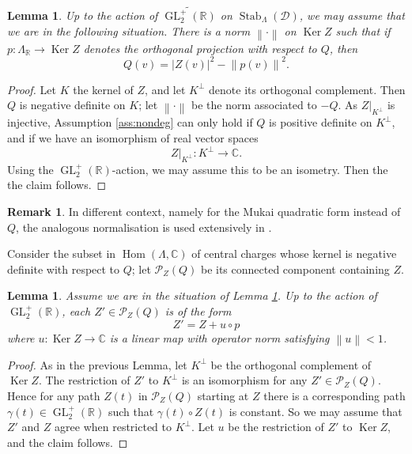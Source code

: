 \documentclass[leqno,11pt,twoside]{amsart}
\newtheorem{Lem}[Thm]{Lemma}
\theoremstyle{definition}
\newtheorem{Rem}[Thm]{Remark}
\begin{document}
\begin{Lem} \label{lem:coords}
Up to the action of ${\widetilde{{\mathop{\mathrm{GL}}\nolimits}_2^+({\ensuremath{\mathbb{R}}})}}$ on ${\mathop{\mathrm{Stab}}\nolimits}_\Lambda({\ensuremath{\mathcal D}})$, we may assume that we are in
the following situation.
There is a norm $\left\|\cdot\right\|$ on ${\mathop{\mathrm{Ker}}\nolimits} Z$ such that if $p \colon \Lambda_{\ensuremath{\mathbb{R}}} \to {\mathop{\mathrm{Ker}}\nolimits} Z$ denotes the orthogonal
projection with respect to $Q$, then
\[ Q(v) = {\left\lvert{Z(v)}\right\rvert}^2 - {\left\|{p(v)}\right\|}^2.\]
\end{Lem}
\begin{proof}
Let $K$ the kernel of $Z$, and let $K^\perp$ denote its orthogonal complement. Then $Q$ is negative
definite on $K$; let ${\left\|{\cdot}\right\|}$ be the norm associated to $-Q$. 
As $Z|_{K^\perp}$ is injective, Assumption \ref{ass:nondeg} can only hold
if $Q$ is positive definite on $K^\perp$, and  if we have an isomorphism of real vector spaces
\[ Z|_{K^\perp} \colon K^\perp \to {\ensuremath{\mathbb{C}}}. \]
Using the ${\mathop{\mathrm{GL}}\nolimits}_2^+({\ensuremath{\mathbb{R}}})$-action, we may assume this to be an
isometry. Then the the claim follows.
\end{proof}

\begin{Rem} In different context, namely for the Mukai quadratic form instead of $Q$, the analogous normalisation is used extensively in \cite{Bridgeland:K3}.
\end{Rem}

Consider the subset in ${\mathop{\mathrm{Hom}}\nolimits}(\Lambda, {\ensuremath{\mathbb{C}}})$ of central charges whose kernel is
negative definite with respect to $Q$; let ${\ensuremath{\mathcal P}}_Z(Q)$ be its connected component containing $Z$.
\begin{Lem} \label{lem:deformincoords}
Assume we are in the situation of Lemma \ref{lem:coords}.
Up to the action of ${\mathop{\mathrm{GL}}\nolimits}_2^+({\ensuremath{\mathbb{R}}})$, each $Z' \in {\ensuremath{\mathcal P}}_Z(Q)$ is of the form 
\[ Z' = Z + u \circ p \]
where $u \colon {\mathop{\mathrm{Ker}}\nolimits} Z \to {\ensuremath{\mathbb{C}}}$ is a linear map with operator norm satisfying ${\left\|{u}\right\|} < 1$.
\end{Lem}
\begin{proof}
As in the previous Lemma, let $K^\perp$ be the orthogonal complement of ${\mathop{\mathrm{Ker}}\nolimits} Z$. 
The restriction of $Z'$ to $K^\perp$ is an isomorphism for any $Z' \in {\ensuremath{\mathcal P}}_Z(Q)$. Hence for any path $Z(t)$
in ${\ensuremath{\mathcal P}}_Z(Q)$ starting at $Z$ there is a corresponding path $\gamma(t) \in {\mathop{\mathrm{GL}}\nolimits}_2^+({\ensuremath{\mathbb{R}}})$ 
such that $\gamma(t) \circ Z(t)$ is constant. So we may assume that
$Z'$ and $Z$ agree when restricted to $K^\perp$. Let $u$ be the restriction of $Z'$ to
${\mathop{\mathrm{Ker}}\nolimits} Z$, and the claim follows.
\end{proof}
\end{document}
